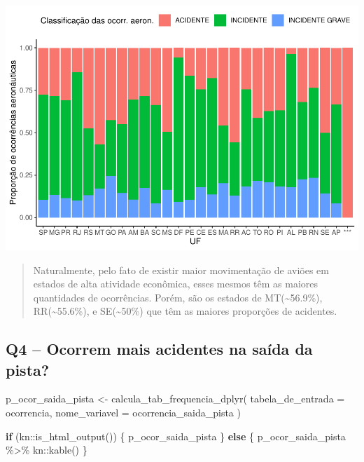 \documentclass[
]{article}
\newenvironment{Shaded}{\begin{snugshade}}{\end{snugshade}}
\newcommand{\AttributeTok}[1]{\textcolor[rgb]{0.77,0.63,0.00}{#1}}
\newcommand{\ControlFlowTok}[1]{\textcolor[rgb]{0.13,0.29,0.53}{\textbf{#1}}}
\newcommand{\FunctionTok}[1]{\textcolor[rgb]{0.00,0.00,0.00}{#1}}
\newcommand{\NormalTok}[1]{#1}
\newcommand{\OtherTok}[1]{\textcolor[rgb]{0.56,0.35,0.01}{#1}}
\newcommand{\SpecialCharTok}[1]{\textcolor[rgb]{0.00,0.00,0.00}{#1}}
\newcommand{\StringTok}[1]{\textcolor[rgb]{0.31,0.60,0.02}{#1}}
\begin{document}
\begin{center}\includegraphics[width=1\linewidth]{../4.Relatorio/pdf/index_files/figure-latex/unnamed-chunk-34-1} \end{center}

\begin{quote}
Naturalmente, pelo fato de existir maior movimentação de aviões em
estados de alta atividade econômica, esses mesmos têm as maiores
quantidades de ocorrências. Porém, são os estados de
MT(\textasciitilde56.9\%), RR(\textasciitilde55.6\%), e
SE(\textasciitilde50\%) que têm as maiores proporções de acidentes.
\end{quote}

\hypertarget{q4-ocorrem-mais-acidentes-na-sauxedda-da-pista}{%
\subsection{Q4 -- Ocorrem mais acidentes na saída da
pista?}\label{q4-ocorrem-mais-acidentes-na-sauxedda-da-pista}}

\begin{Shaded}
\begin{Highlighting}[]
\NormalTok{p\_ocor\_saida\_pista }\OtherTok{\textless{}{-}} \FunctionTok{calcula\_tab\_frequencia\_dplyr}\NormalTok{(}
    \AttributeTok{tabela\_de\_entrada =}\NormalTok{ ocorrencia,}
    \AttributeTok{nome\_variavel =} \StringTok{\textasciigrave{}}\AttributeTok{ocorrencia\_saida\_pista}\StringTok{\textasciigrave{}}
\NormalTok{)}

\ControlFlowTok{if}\NormalTok{ (kn}\SpecialCharTok{::}\FunctionTok{is\_html\_output}\NormalTok{()) \{}
\NormalTok{    p\_ocor\_saida\_pista}
\NormalTok{\} }\ControlFlowTok{else}\NormalTok{ \{}
\NormalTok{    p\_ocor\_saida\_pista }\SpecialCharTok{\%\textgreater{}\%}\NormalTok{ kn}\SpecialCharTok{::}\FunctionTok{kable}\NormalTok{()}
\NormalTok{\}}
\end{Highlighting}
\end{Shaded}
\end{document}

